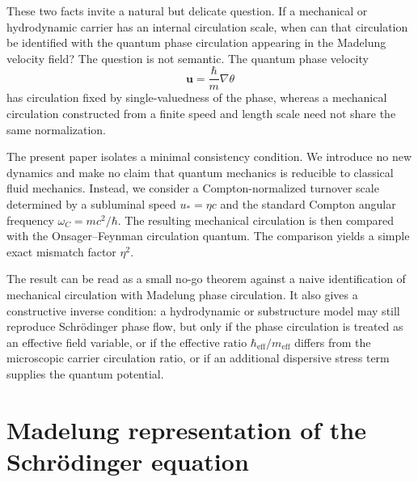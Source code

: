 \documentclass[11pt,a4paper]{article}
\newcommand{\omegaC}{\omega_{C}}
\newcommand{\uStar}{u_{*}}
\newcommand{\hbareff}{\hbar_{\mathrm{eff}}}
\newcommand{\meff}{m_{\mathrm{eff}}}
\begin{document}
These two facts invite a natural but delicate question. If a mechanical or hydrodynamic carrier has an internal circulation scale, when can that circulation be identified with the quantum phase circulation appearing in the Madelung velocity field? The question is not semantic. The quantum phase velocity
\begin{equation}
    \mathbf{u}=\frac{\hbar}{m}\nabla\theta
\end{equation}
has circulation fixed by single-valuedness of the phase, whereas a mechanical circulation constructed from a finite speed and length scale need not share the same normalization.

The present paper isolates a minimal consistency condition. We introduce no new dynamics and make no claim that quantum mechanics is reducible to classical fluid mechanics. Instead, we consider a Compton-normalized turnover scale determined by a subluminal speed $\uStar=\eta c$ and the standard Compton angular frequency $\omegaC=mc^2/\hbar$. The resulting mechanical circulation is then compared with the Onsager--Feynman circulation quantum. The comparison yields a simple exact mismatch factor $\eta^2$.

The result can be read as a small no-go theorem against a naive identification of mechanical circulation with Madelung phase circulation. It also gives a constructive inverse condition: a hydrodynamic or substructure model may still reproduce Schr\"odinger phase flow, but only if the phase circulation is treated as an effective field variable, or if the effective ratio $\hbareff/\meff$ differs from the microscopic carrier circulation ratio, or if an additional dispersive stress term supplies the quantum potential.

\section{Madelung representation of the Schr\"odinger equation}
\end{document}
